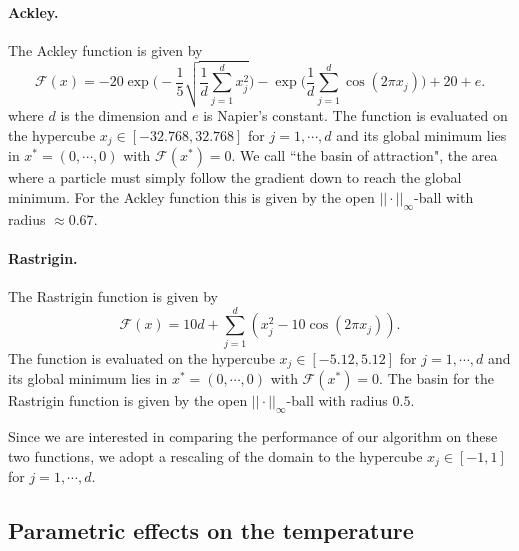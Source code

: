 \documentclass[10pt,a4paper]{article}
\theoremstyle{theorem}
\numberwithin{equation}{section}
\begin{document}
\paragraph{Ackley.}
The Ackley function is given by
\begin{equation}
\label{eq:ackley}
\mathcal{F}(x)=-20\exp\Bigg(-\frac{1}{5}\sqrt{\frac{1}{d}\sum_{j=1}^d x_j^2}\Bigg)-\exp\Bigg(\frac{1}{d}\sum_{j=1}^d\cos(2\pi x_j)\Bigg)+20+e.
\end{equation}
where $d$ is the dimension and $e$ is Napier's constant. The function is evaluated on the hypercube $x_j\in[-32.768,32.768]$ for $j=1,\cdots,d$ and its global minimum lies in $x^*=(0,\cdots,0)$ with $\mathcal{F}(x^*)=0$. We call ``the basin of attraction", the area where a particle must simply follow the gradient down to reach the global minimum. For the Ackley function this is given by the open $||\cdot||_\infty$-ball with radius $\approx 0.67$.

\paragraph{Rastrigin.} 
The Rastrigin function is given by
\begin{equation}
\label{eq:rastrigin}
\mathcal{F}(x)
=
10d+\sum_{j=1}^d\left(x_j^2-10\cos(2\pi x_j)\right).
\end{equation}
The function is evaluated on the hypercube $x_j\in[-5.12,5.12]$ for $j=1,\cdots,d$ and its global minimum lies in $x^*=(0,\cdots,0)$ with $\mathcal{F}(x^*)=0$.
The basin for the Rastrigin function is given by the open $||\cdot||_\infty$-ball with radius $0.5$.

Since we are interested in comparing the performance of our algorithm on these two functions, we adopt a rescaling of the domain to the hypercube $x_j\in[-1,1]$ for $j=1,\cdots,d$.

\subsection{Parametric effects on the temperature}
\end{document}
